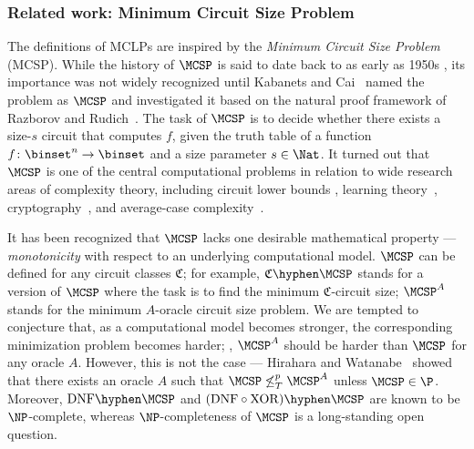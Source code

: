 \documentclass{toc}
\begin{document}
\subsubsection{Related work: Minimum Circuit Size Problem}
The definitions of MCLPs  are inspired by
the \emph{Minimum Circuit Size Problem} (MCSP).
%
%
While the history of $\MCSP$ is said to date back to as early as 1950s \cite{Trakhtenbrot84_annals_journals},
its importance was not widely recognized
until
Kabanets and Cai~\cite{KabanetsC00_stoc_conf}
named the problem as $\MCSP$
and investigated it
based on the natural proof framework of Razborov and Rudich~\cite{RazborovR97_jcss_journals}.
The task of $\MCSP$
is
to decide whether there exists a size-$s$ circuit that computes $f$,
given the truth table of a function $f \colon \binset^n \to \binset$
and a size parameter $s \in \Nat$.
It turned out
that
$\MCSP$
is one of the central computational problems
in relation to wide research areas of complexity theory,
including
circuit lower bounds \cite{RazborovR97_jcss_journals,OliveiraS18_focs_conf},
learning theory~\cite{CarmosinoIKK16_coco_conf},
cryptography~\cite{RazborovR97_jcss_journals, AllenderBKMR06_siamcomp_journals, AllenderH19_toct_journals, Santhanam20_innovations_conf},
and
average-case complexity~\cite{Hirahara18_focs_conf}.


It has been recognized that $\MCSP$ lacks one desirable mathematical property --- \emph{monotonicity} with respect to an underlying computational model.
$\MCSP$ can be defined for any circuit classes $\mathfrak{C}$;
for example,
$\mathfrak{C}\hyphen\MCSP$ stands for a version of $\MCSP$ where the task is to find the minimum $\mathfrak{C}$-circuit size;
$\MCSP^A$ stands for the minimum $A$-oracle circuit size problem.
We are tempted to conjecture that,
as a computational model becomes stronger,
the corresponding minimization problem becomes harder;
\eg,
$\MCSP^A$ should be harder than $\MCSP$ for any oracle $A$.
However, this is not the case ---
Hirahara and Watanabe~\cite{HiraharaW16_coco_conf}
showed that there exists an oracle $A$ such that $\MCSP \not\le^p_T \MCSP^A$
unless $\MCSP \in \P$.
Moreover, $\mathrm{DNF}\hyphen\MCSP$ \cite{Masek79,AllenderHMPS08_siamcomp_journals} and $(\mathrm{DNF}\circ\mathrm{XOR})\hyphen\MCSP$ \cite{HiraharaOS18_coco_conf}
are known to be $\NP$-complete, whereas $\NP$-completeness of $\MCSP$ is a long-standing open question.
%
\end{document}
